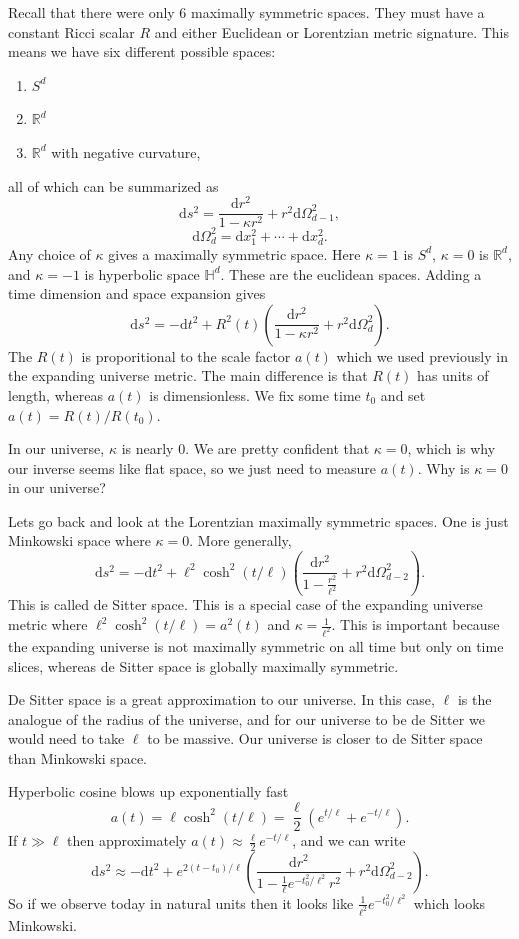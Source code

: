 
Recall that there were only 6 maximally symmetric spaces. They must have a constant Ricci scalar $R$ and either Euclidean or Lorentzian metric signature. This means we have six different possible spaces:
\begin{enumerate}
	\item $S^d$\\
	\item $\mathbb{R} ^d$\\
	\item $\mathbb{R} ^d$ with negative curvature,
\end{enumerate}
all of which can be summarized as
\[
	\mathrm{d} s^2=\frac{\mathrm{d} r^2}{1-\kappa r^2}+r^2 \mathrm{d} \Omega ^2_{d-1} ,
\]
\[
	\mathrm{d} \Omega ^2_d = \mathrm{d}x_1^2+\cdots+\mathrm{d} x_d^2
.\]
Any choice of $\kappa $ gives a maximally symmetric space. Here $\kappa =1$ is $S^d$, $\kappa =0$ is $\mathbb{R} ^d$, and $\kappa =-1$ is hyperbolic space $\mathbb{H}^d$. These are the euclidean spaces. Adding a time dimension and space expansion gives 
\[
	\mathrm{d} s^2=-\mathrm{d} t^2+R^2(t)\left( \frac{\mathrm{d} r^2}{1-\kappa r^2} +r^2 \mathrm{d} \Omega ^2_d \right) 
.\]
The $R(t)$ is proporitional to the scale factor $a(t)$ which we used previously in the expanding universe metric. The main difference is that $R(t)$ has units of length, whereas $a(t)$ is dimensionless. We fix some time $t_0$ and set $a(t)=R(t) /R(t_0)$.

In our universe, $\kappa $ is nearly 0. We are pretty confident that $\kappa =0$, which is why our inverse seems like flat space, so we just need to measure $a(t)$. Why is $\kappa =0$ in our universe?

Lets go back and look at the Lorentzian maximally symmetric spaces. One is just Minkowski space where $\kappa =0$. More generally,
\[
	\mathrm{d} s^2=-\mathrm{d} t^2+\ell ^2\cosh^2(t/\ell )\left( \frac{\mathrm{d} r^2}{1-\frac{r^2}{\ell ^2} }  +r^2\mathrm{d} \Omega _{d-2}^2\right) 
.\]
This is called de Sitter space. This is a special case of the expanding universe metric where $\ell ^2\cosh^2(t/\ell )=a^2(t)$ and $\kappa =\frac{1}{\ell ^2} $. This is important because the expanding universe is not maximally symmetric on all time but only on time slices, whereas de Sitter space is globally maximally symmetric.

De Sitter space is a great approximation to our universe. In this case, $\ell $ is the analogue of the radius of the universe, and for our universe to be de Sitter we would need to take $\ell $ to be massive. Our universe is closer to de Sitter space than Minkowski space.

Hyperbolic cosine blows up exponentially fast
\[
	a(t)=\ell \cosh^2(t/\ell )=\frac{\ell }{2} \left( e^{t/\ell } +e^{-t/\ell }  \right) 
.\]
If $t\gg \ell $ then approximately $a(t) \approx \frac{\ell }{2} e^{-t/\ell } $, and we can write
\[
	\mathrm{d} s^2 \approx -\mathrm{d} t^2+e^{2(t-t_0) /\ell } \left( \frac{\mathrm{d} r^2}{1-\frac{1}{\ell } e^{-t_0^2 /\ell ^2} r^2} +r^2 \mathrm{d} \Omega ^2_{d-2}  \right) 
.\]
So if we observe today in natural units then it looks like $\frac{1}{\ell ^2} e^{-t_0^2 /\ell ^2} $ which looks Minkowski.

